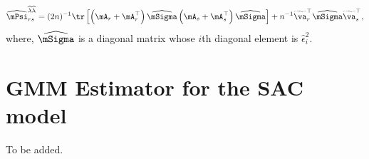 \begin{equation}
  \widehat{\mPsi}^{\widehat{\lambda}\widehat{\lambda}}_{rs} = (2n)^{-1}\tr\left[\left(\mA_r + \mA_r^\top\right)\widehat{\mSigma}\left(\mA_s + \mA_s^\top\right)\widehat{\mSigma}\right]  + n^{-1}\widetilde{\va}_r^\top\widehat{\mSigma}\widetilde{\va}_s^\top,
\end{equation}
%
where, $\widehat{\mSigma}$ is a diagonal matrix whose $i$th diagonal element is $\widehat{\epsilon}_i^2$. 


\section{GMM Estimator for the SAC model}

To be added. 
% 
